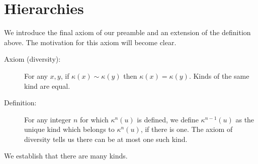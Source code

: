 \documentclass[12pt]{article}
\begin{document}
\newpage

\section{Hierarchies}






We introduce the final axiom of our preamble and an extension of the definition above.  The motivation for this axiom will become clear.

\begin{description}

\item[Axiom (diversity):]  For any $x,y$, if $\kappa(x)\sim \kappa(y)$ then $\kappa(x)=\kappa(y)$.  Kinds of the same kind are equal.

\item[Definition:]  For any integer $n$ for which $\kappa^n(u)$ is defined, we define $\kappa^{n-1}(u)$
as the unique kind which belongs to $\kappa^n(u)$, if there is one.  The axiom of diversity tells us there can be at most one such kind.

\end{description}

We establish that there are many kinds.
\end{document}
